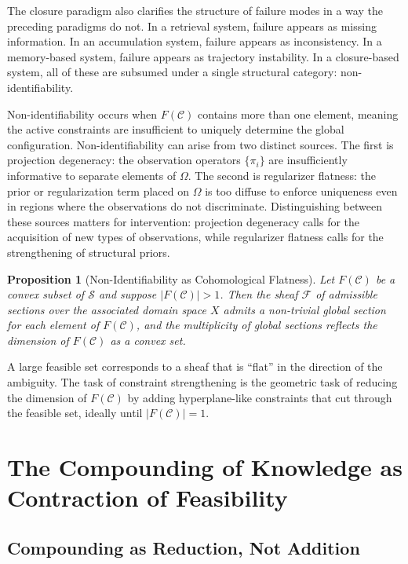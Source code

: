 \documentclass[12pt, oneside]{article}
\newtheorem{proposition}{Proposition}
\begin{document}
The closure paradigm also clarifies the structure of failure modes in a way the preceding paradigms do not. In a retrieval system, failure appears as missing information. In an accumulation system, failure appears as inconsistency. In a memory-based system, failure appears as trajectory instability. In a closure-based system, all of these are subsumed under a single structural category: non-identifiability.

Non-identifiability occurs when $F(\mathcal{C})$ contains more than one element, meaning the active constraints are insufficient to uniquely determine the global configuration. Non-identifiability can arise from two distinct sources. The first is projection degeneracy: the observation operators $\{\pi_i\}$ are insufficiently informative to separate elements of $\Omega$. The second is regularizer flatness: the prior or regularization term placed on $\Omega$ is too diffuse to enforce uniqueness even in regions where the observations do not discriminate. Distinguishing between these sources matters for intervention: projection degeneracy calls for the acquisition of new types of observations, while regularizer flatness calls for the strengthening of structural priors.

\begin{proposition}[Non-Identifiability as Cohomological Flatness]
Let $F(\mathcal{C})$ be a convex subset of $\mathcal{S}$ and suppose $|F(\mathcal{C})| > 1$. Then the sheaf $\mathcal{F}$ of admissible sections over the associated domain space $X$ admits a non-trivial global section for each element of $F(\mathcal{C})$, and the multiplicity of global sections reflects the dimension of $F(\mathcal{C})$ as a convex set.
\end{proposition}

A large feasible set corresponds to a sheaf that is ``flat'' in the direction of the ambiguity. The task of constraint strengthening is the geometric task of reducing the dimension of $F(\mathcal{C})$ by adding hyperplane-like constraints that cut through the feasible set, ideally until $|F(\mathcal{C})| = 1$.

\section{The Compounding of Knowledge as Contraction of Feasibility}

\subsection{Compounding as Reduction, Not Addition}
\end{document}
